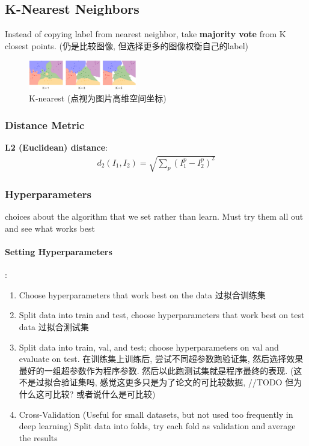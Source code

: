 \subsection{K-Nearest Neighbors}
Instead of copying label from nearest neighbor, take \textbf{majority vote} from K closest points. (仍是比较图像, 但选择更多的图像权衡自己的label)

\begin{figure}[!htb]
    \centering
    \includegraphics[width=0.42\textwidth]{pic/Lec2/K-nearest}
    \caption{K-nearest (点视为图片高维空间坐标)}
\end{figure}

\subsubsection{Distance Metric}
\textbf{L2 (Euclidean) distance}:
\begin{align*}
    d_2(I_1, I_2)=\sqrt{\sum_p(I_1^p-I_2^p)^2}
\end{align*}

\subsubsection{Hyperparameters}
choices about the algorithm that we set rather than learn. Must try them all out and see what works best

\paragraph{Setting Hyperparameters}: 
\begin{enumerate}
    \item Choose hyperparameters that work best on the data 过拟合训练集
    \item Split data into train and test, choose hyperparameters that work best on test data 过拟合测试集
    \item Split data into train, val, and test; choose hyperparameters on val and evaluate on test. 在训练集上训练后, 尝试不同超参数跑验证集, 然后选择效果最好的一组超参数作为程序参数. 然后以此跑测试集就是程序最终的表现. (这不是过拟合验证集吗, 感觉这更多只是为了论文的可比较数据, //TODO  但为什么这可比较? 或者说什么是可比较) 
    \item Cross-Validation (Useful for small datasets, but not used too frequently in deep learning) Split data into folds, try each fold as validation and average the results
\end{enumerate}

